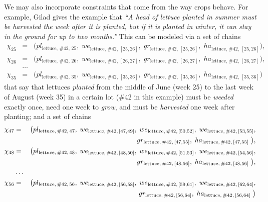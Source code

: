 \documentclass[11pt,reqno]{amsart}
\numberwithin{equation}{section}
\begin{document}
We may also incorporate constraints that come from the way crops behave. For example,
Gilad gives the example that \emph{``A head of lettuce planted in summer must be harvested
  the week after it is planted, but if it is planted in winter, it can stay in the ground
  for up to two months.''} This can be modeled via a set of chains 
\begin{eqnarray*}
   \chi_{25} 
   &=& 
   \big(
      pl_{\text{lettuce},\, \text{\#42},\, 25}, \; 
      we_{\text{lettuce},\, \text{\#42},\, [25,26]}, \;
      gr_{\text{lettuce},\, \text{\#42},\, [25,26]}, \;
      ha_{\text{lettuce},\, \text{\#42},\, [25,26]}
      \big), \\
   \chi_{26} 
   &=& 
   \big(
      pl_{\text{lettuce},\, \text{\#42},\, 26}, \; 
      we_{\text{lettuce},\, \text{\#42},\, [26,27]}, \;
      gr_{\text{lettuce},\, \text{\#42},\, [26,27]}, \;
      ha_{\text{lettuce},\, \text{\#42},\, [26,27]}
      \big), \\
   &\dots& \\
   \chi_{35} 
   &=& 
   \big(
      pl_{\text{lettuce},\, \text{\#42},\, 35}, \; 
      we_{\text{lettuce},\, \text{\#42},\, [35,36]}, \;
      gr_{\text{lettuce},\, \text{\#42},\, [35,36]}, \;
      ha_{\text{lettuce},\, \text{\#42},\, [35,36]}
      \big)
\end{eqnarray*}
that say that lettuces \emph{planted} from the middle of June (week 25) to the last week
of August (week 35) in a certain lot (\#42 in this example) must be \emph{weeded} exactly
once, need one week to \emph{grow}, and must be \emph{harvested} one week after planting;
and a set of chains
\begin{eqnarray*}
    \chi_{47} 
   &=& 
   \big(
      pl_{\text{lettuce},\, \text{\#42},\, 47}, \; 
      we_{\text{lettuce},\, \text{\#42},\, [47,49]}, \;
      we_{\text{lettuce},\, \text{\#42},\, [50,52]}, \;
      we_{\text{lettuce},\, \text{\#42},\, [53,55]}, 
   \\ && \hspace{5.4cm}
      gr_{\text{lettuce},\, \text{\#42},\, [47,55]}, \;
      ha_{\text{lettuce},\, \text{\#42},\, [47,55]} \;
      \big), \\
    \chi_{48} 
   &=& 
   \big(
      pl_{\text{lettuce},\, \text{\#42},\, 48}, \; 
      we_{\text{lettuce},\, \text{\#42},\, [48,50]}, \;
      we_{\text{lettuce},\, \text{\#42},\, [51,53]}, \;
      we_{\text{lettuce},\, \text{\#42},\, [54,56]}, 
   \\ && \hspace{5.4cm}
      gr_{\text{lettuce},\, \text{\#42},\, [48,56]}, \;
      ha_{\text{lettuce},\, \text{\#42},\, [48,56]} \;
      \big), \\
   &\dots& \\
   \chi_{56} 
   &=& 
   \big(
      pl_{\text{lettuce},\, \text{\#42},\, 56}, \; 
      we_{\text{lettuce},\, \text{\#42},\, [56,58]}, \;
      we_{\text{lettuce},\, \text{\#42},\, [59,61]}, \;
      we_{\text{lettuce},\, \text{\#42},\, [62,64]}, 
   \\ && \hspace{5.4cm}
      gr_{\text{lettuce},\, \text{\#42},\, [56,64]}, \;
      ha_{\text{lettuce},\, \text{\#42},\, [56,64]} \;
      \big)
\end{eqnarray*}
\end{document}
